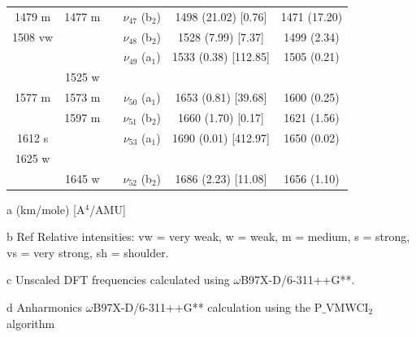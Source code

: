 \begin{table}[H]
\begin{center}
\begin{threeparttable}
\begin{tabular}{c c c c c c}
1479 m & 1477 m &  & $\nu_{47}$ (b$_{2}$) & 1498 (21.02) [0.76] & 1471 (17.20) \\ 
1508 vw &  &  & $\nu_{48}$ (b$_{2}$) & 1528 (7.99) [7.37] & 1499 (2.34) \\ 
&  &  & $\nu_{49}$ (a$_{1}$) & 1533 (0.38) [112.85] & 1505 (0.21) \\ 
& 1525 w &  &  &  &  \\ 
1577 m & 1573 m &  & $\nu_{50}$ (a$_{1}$) & \multicolumn{1}{c}{1653 (0.81) [39.68]} & 1600 (0.25) \\ 
& 1597 m &  & $\nu_{51}$ (b$_{2}$) & \multicolumn{1}{c}{1660 (1.70) [0.17]} & 1621 (1.56) \\ 
1612 s &  &  & $\nu_{53}$ (a$_{1}$) & \multicolumn{1}{c}{1690 (0.01) [412.97]} & 1650 (0.02) \\ 
1625 w &  &  &  & \multicolumn{1}{c}{} &  \\ 
& 1645 w &  & $\nu_{52}$ (b$_{2}$) & \multicolumn{1}{c}{1686 (2.23) [11.08]} & 1656 (1.10) \\ 
\bottomrule
\end{tabular}

\begin{tablenotes}
	\item[a] (km/mole) [A$^{4}$/AMU]
	\item[b] Ref \cite{michaelian2014raman} Relative intensities: vw = very weak, w = weak, m = medium, s = strong, vs = very strong, sh = shoulder.
	\item[c] Unscaled DFT frequencies calculated using $\omega$B97X-D/6-311++G**.
	\item[d] Anharmonics $\omega$B97X-D/6-311++G** calculation using the P$\_$VMWCI$_{2}$ algorithm
\end{tablenotes}
\end{threeparttable}
\end{center}
\label{freq-Fluorene}
\end{table}


